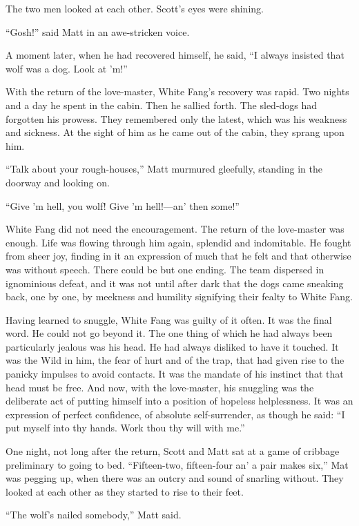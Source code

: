 \documentclass[10pt]{book}
\begin{document}
The two men looked at each other. Scott’s eyes were shining.

“Gosh!” said Matt in an awe-stricken voice.

A moment later, when he had recovered himself, he said, “I always
insisted that wolf was a dog. Look at ’m!”

With the return of the love-master, White Fang’s recovery was rapid.
Two nights and a day he spent in the cabin. Then he sallied forth. The
sled-dogs had forgotten his prowess. They remembered only the latest,
which was his weakness and sickness. At the sight of him as he came out
of the cabin, they sprang upon him.

“Talk about your rough-houses,” Matt murmured gleefully, standing in
the doorway and looking on.

“Give ’m hell, you wolf! Give ’m hell!—an’ then some!”

White Fang did not need the encouragement. The return of the
love-master was enough. Life was flowing through him again, splendid
and indomitable. He fought from sheer joy, finding in it an expression
of much that he felt and that otherwise was without speech. There could
be but one ending. The team dispersed in ignominious defeat, and it was
not until after dark that the dogs came sneaking back, one by one, by
meekness and humility signifying their fealty to White Fang.

Having learned to snuggle, White Fang was guilty of it often. It was
the final word. He could not go beyond it. The one thing of which he
had always been particularly jealous was his head. He had always
disliked to have it touched. It was the Wild in him, the fear of hurt
and of the trap, that had given rise to the panicky impulses to avoid
contacts. It was the mandate of his instinct that that head must be
free. And now, with the love-master, his snuggling was the deliberate
act of putting himself into a position of hopeless helplessness. It was
an expression of perfect confidence, of absolute self-surrender, as
though he said: “I put myself into thy hands. Work thou thy will with
me.”

One night, not long after the return, Scott and Matt sat at a game of
cribbage preliminary to going to bed. “Fifteen-two, fifteen-four an’ a
pair makes six,” Mat was pegging up, when there was an outcry and sound
of snarling without. They looked at each other as they started to rise
to their feet.

“The wolf’s nailed somebody,” Matt said.
\end{document}
